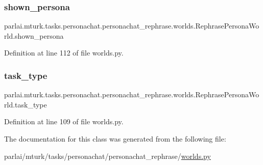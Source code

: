 \subsubsection{\texorpdfstring{shown\+\_\+persona}{shown\_persona}}
{\footnotesize\ttfamily parlai.\+mturk.\+tasks.\+personachat.\+personachat\+\_\+rephrase.\+worlds.\+Rephrase\+Persona\+World.\+shown\+\_\+persona}



Definition at line 112 of file worlds.\+py.

\mbox{\label{classparlai_1_1mturk_1_1tasks_1_1personachat_1_1personachat__rephrase_1_1worlds_1_1RephrasePersonaWorld_a6c50e33e2d0592d4d85161a6cdb94b8d}} 
\subsubsection{\texorpdfstring{task\+\_\+type}{task\_type}}
{\footnotesize\ttfamily parlai.\+mturk.\+tasks.\+personachat.\+personachat\+\_\+rephrase.\+worlds.\+Rephrase\+Persona\+World.\+task\+\_\+type}



Definition at line 109 of file worlds.\+py.



The documentation for this class was generated from the following file\+:\begin{DoxyCompactItemize}
\item 
parlai/mturk/tasks/personachat/personachat\+\_\+rephrase/\hyperlink{parlai_2mturk_2tasks_2personachat_2personachat__rephrase_2worlds_8py}{worlds.\+py}\end{DoxyCompactItemize}
